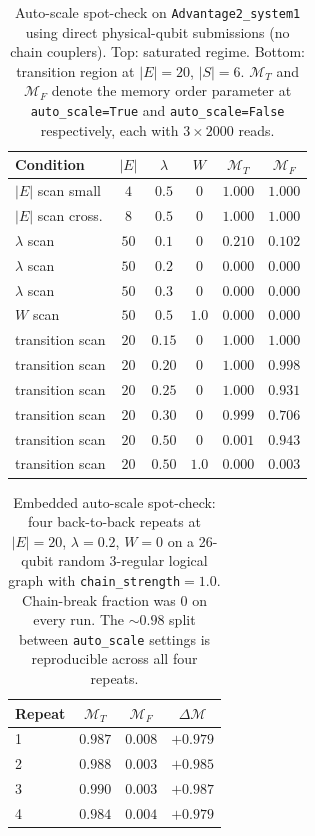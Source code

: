 \documentclass[aps,prapplied,reprint,superscriptaddress,floatfix,nofootinbib]{revtex4-2}
\begin{document}
\begin{table}[!htbp]
\centering
\caption{Auto-scale spot-check on \texttt{Advantage2\_system1} using direct physical-qubit submissions (no chain couplers).  Top: saturated regime.  Bottom: transition region at $|E|=20$, $|S|=6$.  $\mathcal{M}_T$ and $\mathcal{M}_F$ denote the memory order parameter at \texttt{auto\_scale=True} and \texttt{auto\_scale=False} respectively, each with $3\times 2000$ reads.}
\label{tab:autoscale_native}
\small
\begin{tabular}{lccccc}
\toprule
Condition & $|E|$ & $\lambda$ & $W$ & $\mathcal{M}_T$ & $\mathcal{M}_F$ \\
\midrule
$|E|$ scan small   & $4$  & $0.5$ & $0$   & $1.000$ & $1.000$ \\
$|E|$ scan cross.  & $8$  & $0.5$ & $0$   & $1.000$ & $1.000$ \\
$\lambda$ scan     & $50$ & $0.1$ & $0$   & $0.210$ & $0.102$ \\
$\lambda$ scan     & $50$ & $0.2$ & $0$   & $0.000$ & $0.000$ \\
$\lambda$ scan     & $50$ & $0.3$ & $0$   & $0.000$ & $0.000$ \\
$W$ scan           & $50$ & $0.5$ & $1.0$ & $0.000$ & $0.000$ \\
\midrule
transition scan    & $20$ & $0.15$ & $0$  & $1.000$ & $1.000$ \\
transition scan    & $20$ & $0.20$ & $0$  & $1.000$ & $0.998$ \\
transition scan    & $20$ & $0.25$ & $0$  & $1.000$ & $0.931$ \\
transition scan    & $20$ & $0.30$ & $0$  & $0.999$ & $0.706$ \\
transition scan    & $20$ & $0.50$ & $0$  & $0.001$ & $0.943$ \\
transition scan    & $20$ & $0.50$ & $1.0$ & $0.000$ & $0.003$ \\
\bottomrule
\end{tabular}
\end{table}

\begin{table}[!htbp]
\centering
\caption{Embedded auto-scale spot-check: four back-to-back repeats at $|E|=20$, $\lambda=0.2$, $W=0$ on a 26-qubit random 3-regular logical graph with \texttt{chain\_strength$=1.0$}.  Chain-break fraction was $0$ on every run.  The $\sim 0.98$ split between \texttt{auto\_scale} settings is reproducible across all four repeats.}
\label{tab:autoscale_embedded}
\small
\begin{tabular}{lccc}
\toprule
Repeat & $\mathcal{M}_T$ & $\mathcal{M}_F$ & $\Delta\mathcal{M}$ \\
\midrule
1 & $0.987$ & $0.008$ & $+0.979$ \\
2 & $0.988$ & $0.003$ & $+0.985$ \\
3 & $0.990$ & $0.003$ & $+0.987$ \\
4 & $0.984$ & $0.004$ & $+0.979$ \\
\bottomrule
\end{tabular}
\end{table}
\end{document}
